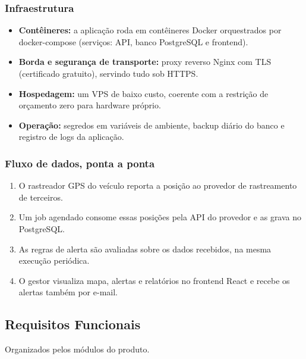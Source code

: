 \documentclass[11pt,a4paper]{article}
\begin{document}
\subsubsection*{Infraestrutura}
\begin{itemize}[itemsep=2pt]
  \item \textbf{Contêineres:} a aplicação roda em contêineres Docker orquestrados por docker-compose (serviços: API, banco PostgreSQL e frontend).
  \item \textbf{Borda e segurança de transporte:} proxy reverso Nginx com TLS (certificado gratuito), servindo tudo sob HTTPS.
  \item \textbf{Hospedagem:} um VPS de baixo custo, coerente com a restrição de orçamento zero para hardware próprio.
  \item \textbf{Operação:} segredos em variáveis de ambiente, backup diário do banco e registro de logs da aplicação.
\end{itemize}

\subsubsection*{Fluxo de dados, ponta a ponta}
\begin{enumerate}[itemsep=2pt]
  \item O rastreador GPS do veículo reporta a posição ao provedor de rastreamento de terceiros.
  \item Um job agendado consome essas posições pela API do provedor e as grava no PostgreSQL.
  \item As regras de alerta são avaliadas sobre os dados recebidos, na mesma execução periódica.
  \item O gestor visualiza mapa, alertas e relatórios no frontend React e recebe os alertas também por e-mail.
\end{enumerate}

\subsection{Requisitos Funcionais}\label{esc:rf}
Organizados pelos módulos do produto.
\end{document}

